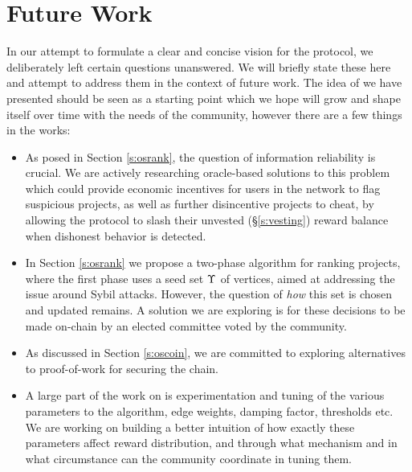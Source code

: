 \section{Future Work}
\label{s:future-work}

In our attempt to formulate a clear and concise vision for the \oscoin{}
protocol, we deliberately left certain questions unanswered. We will
briefly state these here and attempt to address them in the context of future work.
The idea of \oscoin{} we have presented should be seen as a starting point which
we hope will grow and shape itself over time with the needs of the community, however
there are a few things in the works:

\begin{itemize}
\item As posed in Section \ref{s:osrank}, the question of information
reliability is crucial.  We are actively researching oracle-based solutions to
this problem which could provide economic incentives for users in the network
to flag suspicious projects, as well as further disincentive projects to cheat,
by allowing the protocol to slash their unvested (\S\ref{s:vesting}) reward
balance when dishonest behavior is detected.

\item In Section \ref{s:osrank} we propose a two-phase \osrank{} algorithm for
ranking projects, where the first phase uses a seed set $\Upsilon$ of vertices,
aimed at addressing the issue around Sybil attacks.  However, the question of
\emph{how} this set is chosen and updated remains. A solution we are exploring
is for these decisions to be made on-chain by an elected committee voted by
the community.

\item As discussed in Section \ref{s:oscoin}, we are committed to exploring
alternatives to proof-of-work for securing the chain.

\item A large part of the work on \osrank{} is experimentation and tuning of the
various parameters to the algorithm, \eg edge weights, damping factor, thresholds
etc. We are working on building a better intuition of how exactly these parameters
affect reward distribution, and through what mechanism and in what circumstance
can the community coordinate in tuning them.
\end{itemize}
